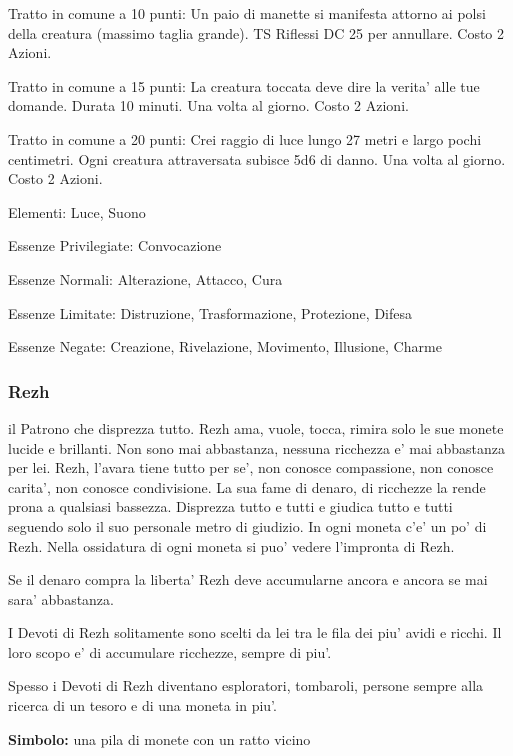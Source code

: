 \documentclass[a4paper,11pt,twoside,openany]{book}
\begin{document}
{		Tratto in comune a 10 punti: Un paio di manette si manifesta attorno ai polsi della creatura (massimo taglia grande). TS Riflessi DC 25 per annullare. Costo 2 Azioni.
		
		Tratto in comune a 15 punti: La creatura toccata deve dire la verita' alle tue domande. Durata 10 minuti. Una volta al giorno. Costo 2 Azioni.
		
		Tratto in comune a 20 punti: Crei raggio di luce lungo 27 metri e largo pochi centimetri. Ogni creatura attraversata subisce 5d6 di danno. Una volta al giorno. Costo 2 Azioni.
		
		\bigskip
		
		Elementi: Luce, Suono
		
		\bigskip
		
		Essenze Privilegiate: Convocazione
		
		Essenze Normali: Alterazione, Attacco, Cura
		
		Essenze Limitate: Distruzione, Trasformazione, Protezione, Difesa
		
		Essenze Negate: Creazione, Rivelazione, Movimento, Illusione, Charme
		
		\subsubsection{Rezh}
		
		\label{rezh}
		
		il Patrono che disprezza tutto. Rezh ama, vuole, tocca, rimira solo le sue monete lucide e brillanti. Non sono mai abbastanza, nessuna ricchezza e' mai abbastanza per lei. Rezh, l'avara tiene tutto per se', non conosce compassione, non conosce carita', non conosce condivisione. La sua fame di denaro, di ricchezze la rende prona a qualsiasi bassezza. Disprezza tutto e tutti e giudica tutto e tutti seguendo solo il suo personale metro di giudizio. In ogni moneta c'e' un po' di Rezh. Nella ossidatura di ogni moneta si puo' vedere l'impronta di Rezh.
		
		Se il denaro compra la liberta' Rezh deve accumularne ancora e ancora se mai sara' abbastanza.
		
		I Devoti di Rezh solitamente sono scelti da lei tra le fila dei piu' avidi e ricchi. Il loro scopo e' di accumulare ricchezze, sempre di piu'.
		
		Spesso i Devoti di Rezh diventano esploratori, tombaroli, persone sempre alla ricerca di un tesoro e di una moneta in piu'.
		
		\textbf{Simbolo:} una pila di monete con un ratto vicino
		
}
\end{document}
